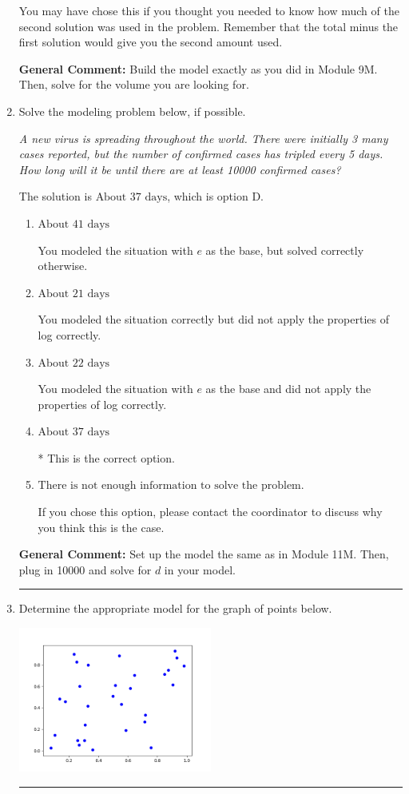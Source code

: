 \documentclass{extbook}[14pt]
\newcommand{\litem}[1]{\item #1

\rule{\textwidth}{0.4pt}}
\begin{document}
\begin{enumerate}
{\begin{enumerate}[label=\Alph*.]
You may have chose this if you thought you needed to know how much of the second solution was used in the problem. Remember that the total minus the first solution would give you the second amount used.
\end{enumerate}

\textbf{General Comment:} Build the model exactly as you did in Module 9M. Then, solve for the volume you are looking for.
}
\litem{
Solve the modeling problem below, if possible.

\begin{center}
    \textit{ A new virus is spreading throughout the world. There were initially 3 many cases reported, but the number of confirmed cases has tripled every 5 days. How long will it be until there are at least 10000 confirmed cases? }
\end{center}
The solution is \( \text{About } 37 \text{ days} \), which is option D.\begin{enumerate}[label=\Alph*.]
\item \( \text{About } 41 \text{ days} \)

You modeled the situation with $e$ as the base, but solved correctly otherwise.
\item \( \text{About } 21 \text{ days} \)

You modeled the situation correctly but did not apply the properties of log correctly.
\item \( \text{About } 22 \text{ days} \)

You modeled the situation with $e$ as the base and did not apply the properties of log correctly.
\item \( \text{About } 37 \text{ days} \)

* This is the correct option.
\item \( \text{There is not enough information to solve the problem.} \)

If you chose this option, please contact the coordinator to discuss why you think this is the case.
\end{enumerate}

\textbf{General Comment:} Set up the model the same as in Module 11M. Then, plug in 10000 and solve for $d$ in your model.
}
\litem{
Determine the appropriate model for the graph of points below.

\begin{center}
    \includegraphics[width=0.5\textwidth]{../Figures/identifyModelGraph12CopyA.png}
\end{center}


}
\end{enumerate}
\end{document}
